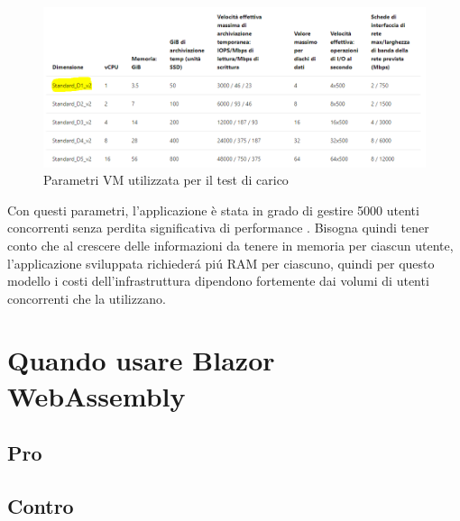 \begin{figure}[H]
	\centerline{\includegraphics[scale=0.5]{figure/Standard_D1_V2.PNG}}
	\caption{Parametri VM utilizzata per il test di carico}
	\label{fig:vmStandardD1V2}
\end{figure}

Con questi parametri, l'applicazione \`e stata in grado di gestire 5000 utenti concorrenti senza perdita significativa di performance \cite{blazorModelsScenarios} \cite{bServerConcurrentUsersTest}.
Bisogna quindi tener conto che al crescere delle informazioni da tenere in memoria per ciascun utente, l'applicazione sviluppata richieder\'a pi\'u RAM per ciascuno, quindi per questo modello i costi dell'infrastruttura dipendono fortemente dai volumi di utenti concorrenti che la utilizzano.

\section{Quando usare Blazor WebAssembly}\label{sez:scalabilitaBWA}
\subsection{Pro}\label{sez:proBWA}


\subsection{Contro}\label{sez:controBWA}